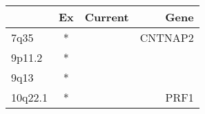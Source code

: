 \begin{tabular}{lccr}
\toprule
{} & Ex & Current &     Gene \\
\midrule
7q35    &  * &         &  CNTNAP2 \\
9p11.2  &  * &         &          \\
9q13    &  * &         &          \\
10q22.1 &  * &         &     PRF1 \\
\bottomrule
\end{tabular}
